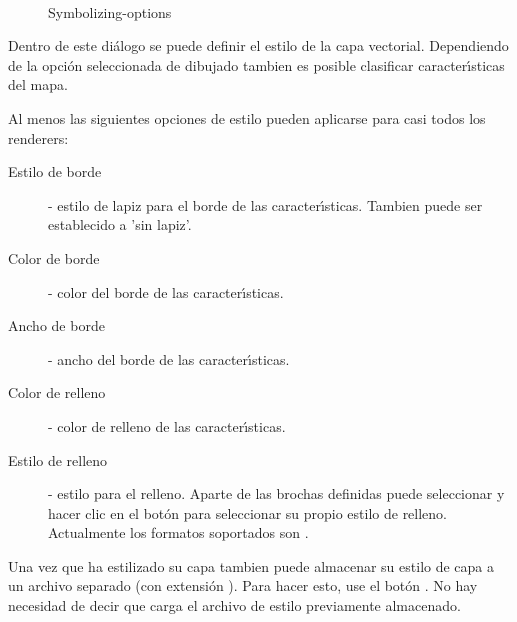 \begin{figure}[h]
\centering
\caption{Symbolizing-options \nixcaption}
   \goodgap
   \\
   \goodgap
\end{figure}


 \label{sec:style_options} 
Dentro de este di\'alogo se puede definir el estilo de la capa vectorial. Dependiendo de la opci\'on
seleccionada de dibujado tambien es posible clasificar caracter\'{\i}sticas del mapa.

Al menos las siguientes opciones de estilo pueden aplicarse para casi todos los renderers:
\begin{description}
 \item[Estilo de borde] - estilo de lapiz para el borde de las caracter\'{\i}sticas. Tambien puede ser
 establecido a 'sin lapiz'.
 \item[Color de borde] - color del borde de las caracter\'{\i}sticas.
 \item[Ancho de borde] - ancho del borde de las caracter\'{\i}sticas.
 \item[Color de relleno] - color de relleno de las caracter\'{\i}sticas.
 \item[Estilo de relleno] - estilo para el relleno. Aparte de las brochas definidas puede
 seleccionar  y hacer clic en el bot\'on \browsebutton
 para seleccionar su propio estilo de relleno. Actualmente los formatos soportados son
 .
\end{description}

Una vez que ha estilizado su capa tambien puede almacenar su estilo de capa a
un archivo separado (con extensi\'on ).
Para hacer esto, use el bot\'on . No hay necesidad de decir que
 carga el archivo de estilo previamente almacenado.

